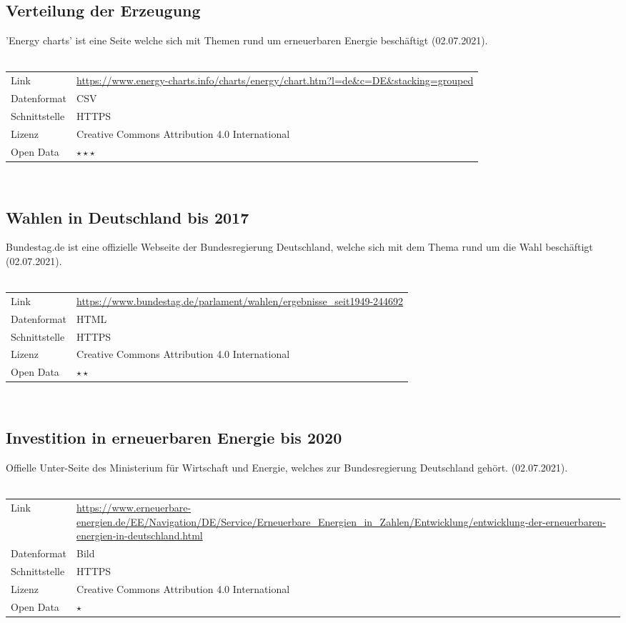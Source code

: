 \documentclass[12pt]{article}
\begin{document}
        \subsection{Verteilung der Erzeugung}
'Energy charts' ist eine Seite welche sich mit Themen rund um erneuerbaren Energie beschäftigt (02.07.2021).\\
\\
\vspace{0.5cm}
\begin{tabular}{l|p{9cm}}
	Link & \url{https://www.energy-charts.info/charts/energy/chart.htm?l=de&c=DE&stacking=grouped} \\
 	Datenformat & CSV \\
 	Schnittstelle & HTTPS\\
 	Lizenz & Creative  Commons Attribution 4.0 International \\
 	Open Data & $\star\star\star $ \\
\end{tabular}
\\

\subsection{Wahlen in Deutschland bis 2017}
    Bundestag.de ist eine offizielle Webseite der Bundesregierung Deutschland, welche sich mit dem Thema rund um die Wahl beschäftigt (02.07.2021).\\
\\
\vspace{0.5cm}
\begin{tabular}{l|p{9cm}}
	Link & \url{https://www.bundestag.de/parlament/wahlen/ergebnisse_seit1949-244692} \\
 	Datenformat & HTML \\
 	Schnittstelle & HTTPS\\
 	Lizenz & Creative  Commons Attribution 4.0 International \\
 	Open Data & $\star\star $ \\
\end{tabular}
\\
\subsection{Investition in erneuerbaren Energie bis 2020}
    Offielle Unter-Seite des Ministerium für Wirtschaft und Energie, welches zur Bundesregierung Deutschland gehört.  (02.07.2021).\\
\\
\vspace{0.5cm}
\begin{tabular}{l|p{9cm}}
	Link & \url{https://www.erneuerbare-energien.de/EE/Navigation/DE/Service/Erneuerbare_Energien_in_Zahlen/Entwicklung/entwicklung-der-erneuerbaren-energien-in-deutschland.html} \\
 	Datenformat & Bild \\
 	Schnittstelle & HTTPS\\
 	Lizenz & Creative  Commons Attribution 4.0 International \\
 	Open Data & $\star $ \\
\end{tabular}
\end{document}
